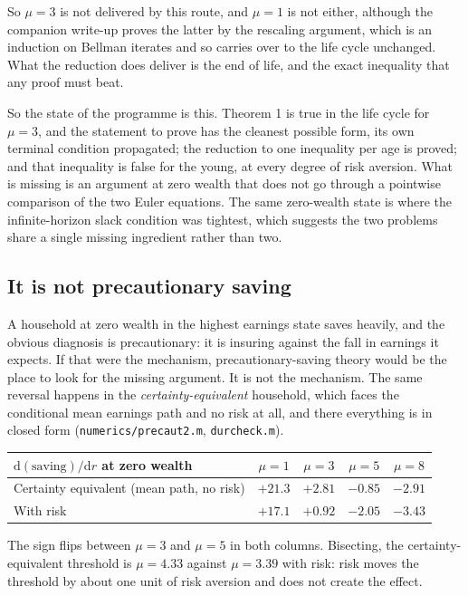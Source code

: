 So $\mu=3$ is not delivered by this route, and $\mu=1$ is not either, although the companion
write-up proves the latter by the rescaling argument, which is an induction on Bellman iterates
and so carries over to the life cycle unchanged. What the reduction does deliver is the end of
life, and the exact inequality that any proof must beat.

So the state of the programme is this. Theorem 1 is true in the life cycle for $\mu=3$, and the
statement to prove has the cleanest possible form, its own terminal condition propagated; the
reduction to one inequality per age is proved; and that inequality is false for the young, at
every degree of risk aversion. What is missing is an argument at zero wealth that does not go
through a pointwise comparison of the two Euler equations. The same zero-wealth state is where the
infinite-horizon slack condition was tightest, which suggests the two problems share a single
missing ingredient rather than two.

\subsection{It is not precautionary saving}

A household at zero wealth in the highest earnings state saves heavily, and the obvious diagnosis
is precautionary: it is insuring against the fall in earnings it expects. If that were the
mechanism, precautionary-saving theory would be the place to look for the missing argument. It is
not the mechanism. The same reversal happens in the \emph{certainty-equivalent} household, which
faces the conditional mean earnings path and no risk at all, and there everything is in closed
form (\texttt{numerics/precaut2.m}, \texttt{durcheck.m}).

\begingroup\small
\begin{center}
\begin{tabular}{@{}lcccc@{}}
\toprule
$\mathrm{d}(\text{saving})/\mathrm{d}r$ at zero wealth & $\mu=1$ & $\mu=3$ & $\mu=5$ & $\mu=8$\\
\midrule
Certainty equivalent (mean path, no risk) & $+21.3$ & $+2.81$ & $-0.85$ & $-2.91$\\
With risk & $+17.1$ & $+0.92$ & $-2.05$ & $-3.43$\\
\bottomrule
\end{tabular}
\end{center}
\endgroup

The sign flips between $\mu=3$ and $\mu=5$ in both columns. Bisecting, the certainty-equivalent
threshold is $\mu=4.33$ against $\mu=3.39$ with risk: risk moves the threshold by about one unit
of risk aversion and does not create the effect.


